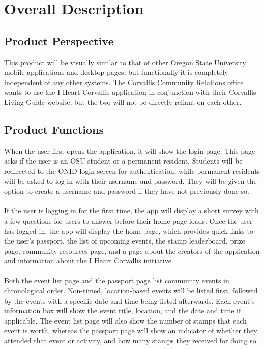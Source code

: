 \documentclass[draftclsnofoot, onecolumn, 10pt, compsoc]{IEEEtran}
\begin{document}
	\section{Overall Description}
		\subsection{Product Perspective}
			This product will be visually similar to that of other Oregon State University mobile applications and desktop pages, but functionally it is completely independent of any other systems. The Corvallis Community Relations office wants to use the I Heart Corvallis application in conjunction with their Corvallis Living Guide website, but the two will not be directly reliant on each other.
		
		\subsection{Product Functions}
			When the user first opens the application, it will show the login page. This page asks if the user is an OSU student or a permanent resident. Students will be redirected to the ONID login screen for authentication, while permanent residents will be asked to log in with their username and password. They will be given the option to create a username and password if they have not previously done so. \\ \\
			If the user is logging in for the first time, the app will display a short survey with a few questions for users to answer before their home page loads. Once the user has logged in, the app will display the home page, which provides quick links to the user's passport, the list of upcoming events, the stamp leaderboard, prize page, community resources page, and a page about the creators of the application and information about the I Heart Corvallis initiative. \\ \\
			Both the event list page and the passport page list community events in chronological order. Non-timed, location-based events will be listed first, followed by the events with a specific date and time being listed afterwards. Each event's information box will show the event title, location, and the date and time if applicable. The event list page will also show the number of stamps that each event is worth, whereas the passport page will show an indicator of whether they attended that event or activity, and how many stamps they received for doing so. \\ \\
\end{document}
